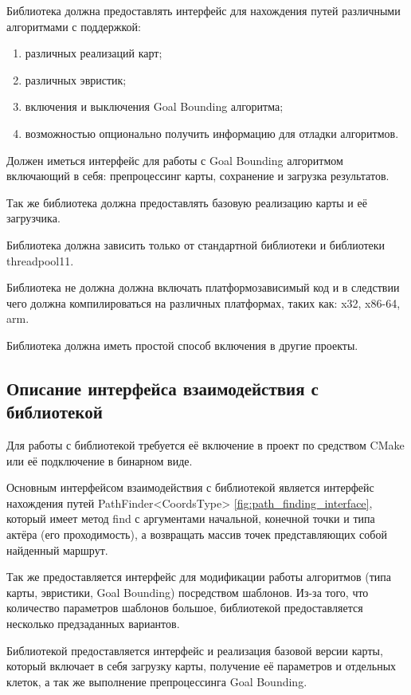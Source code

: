 Библиотека должна предоставлять интерфейс для нахождения путей различными алгоритмами с поддержкой:

\begin{enumerate}
	\item различных реализаций карт;
	\item различных эвристик;
	\item включения и выключения Goal Bounding алгоритма;
	\item возможностью опционально получить информацию для отладки алгоритмов.
\end{enumerate}

Должен иметься интерфейс для работы с Goal Bounding алгоритмом включающий в себя: препроцессинг карты, сохранение и загрузка результатов.

Так же библиотека должна предоставлять базовую реализацию карты и её загрузчика.

Библиотека должна зависить только от стандартной библиотеки и библиотеки threadpool11.

Библиотека не должна должна включать платформозависимый код и в следствии чего должна компилироваться на различных платформах, таких как: x32, x86-64, arm.

Библиотека должна иметь простой способ включения в другие проекты.   

\subsection{Описание интерфейса взаимодействия с библиотекой}

Для работы с библиотекой требуется её включение в проект по средством CMake или её подключение в бинарном виде. 

Основным интерфейсом взаимодействия с библиотекой является интерфейс нахождения путей PathFinder<CoordsType> \cref{fig:path_finding_interface}, который имеет метод find с аргументами начальной, конечной точки и типа актёра (его проходимость), а возвращать массив точек представляющих собой найденный маршрут.


Так же предоставляется интерфейс для модификации работы алгоритмов (типа карты, эвристики, Goal Bounding) посредством шаблонов. Из-за того, что количество параметров шаблонов большое, библиотекой предоставляется несколько предзаданных вариантов.

Библиотекой предоставляется интерфейс и реализация базовой версии карты, который включает в себя загрузку карты, получение её параметров и отдельных клеток, а так же выполнение препроцессинга Goal Bounding.   
